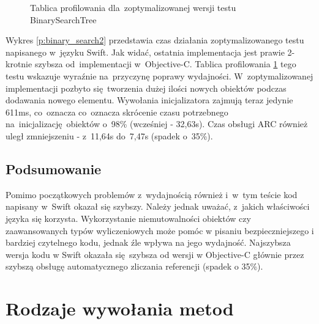 \documentclass[mgr, shortabstract]{iithesis}
\begin{document}
\begin{figure}
    \caption{Tablica profilowania dla~zoptymalizowanej wersji testu BinarySearchTree}
    \label{i:binary_search2}
\end{figure}

Wykres \ref{p:binary_search2} przedstawia czas działania zoptymalizowanego testu napisanego w~języku Swift. Jak widać, ostatnia implementacja jest prawie 2-krotnie szybsza od~implementacji w~Objective-C. Tablica profilowania \ref{i:binary_search2} tego testu wskazuje wyraźnie na~przyczynę poprawy wydajności. W~zoptymalizowanej implementacji pozbyto się tworzenia dużej ilości nowych obiektów podczas dodawania nowego elementu. Wywołania inicjalizatora zajmują teraz jedynie 611ms, co~oznacza co~oznacza skrócenie czasu potrzebnego na~inicjalizację obiektów o~98\% (wcześniej - 32,63s). Czas obsługi ARC również uległ zmniejszeniu - z~11,64s do~7,47s (spadek o~35\%). 

\subsection{Podsumowanie}

Pomimo początkowych problemów z~wydajnością również i~w~tym teście kod napisany w~Swift okazał się szybszy. Należy jednak uważać, z~jakich właściwości języka się korzysta. Wykorzystanie niemutowalności obiektów czy zaawansowanych typów wyliczeniowych może pomóc w pisaniu bezpieczniejszego i bardziej czytelnego kodu, jednak źle wpływa na jego wydajność. Najszybsza wersja kodu w Swift okazała się szybsza od wersji w Objective-C głównie przez szybszą obsługę automatycznego zliczania referencji (spadek o 35\%).

\section{Rodzaje wywołania metod}
\label{s:wywolania_metod}
\end{document}
